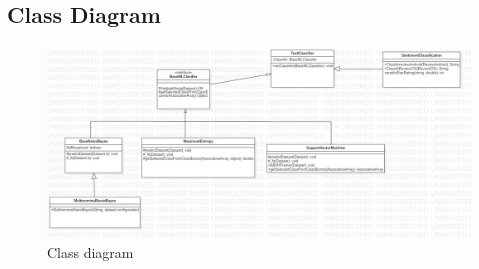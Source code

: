 \documentclass[oneside,a4paper,12pt]{book}
\begin{document}
\subsection{Class Diagram}
\begin{figure}[h!]
  \centering
  \includegraphics[width=\linewidth]{class.png}
  \caption{Class diagram}
\end{figure}
\end{document}
